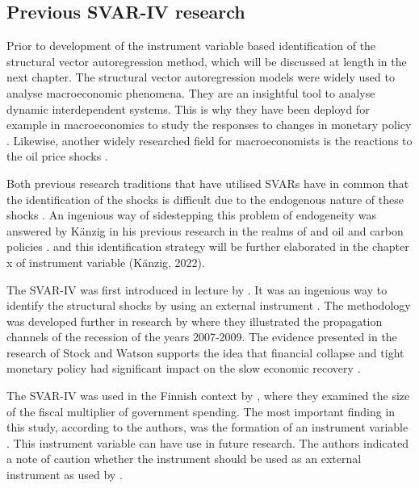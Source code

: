\documentclass[
]{article}
\begin{document}
\hypertarget{prevsvar}{%
\subsection{Previous SVAR-IV research}\label{prevsvar}}

Prior to development of the instrument variable based identification of the structural vector autoregression method, which will be discussed at length in the next chapter. The structural vector autoregression models were widely used to analyse macroeconomic phenomena. They are an insightful tool to analyse dynamic interdependent systems. This is why they have been deployd for example in macroeconomics to study the responses to changes in monetary policy \citep{wolf2020svar}. Likewise, another widely researched field for macroeconomists is the reactions to the oil price shocks \citep{kilian2009not}.

Both previous research traditions that have utilised SVARs have in common that the identification of the shocks is difficult due to the endogenous nature of these shocks \citep{kaenzig2021}. An ingenious way of sidestepping this problem of endogeneity was answered by Känzig in his previous research in the realms of and oil and carbon policies \citep{kaenzig2022,kaenzig2021}. and this identification strategy will be further elaborated in the chapter x of instrument variable (Känzig, 2022).

The SVAR-IV was first introduced in lecture by \citet{stock2008s}. It was an ingenious way to identify the structural shocks by using an external instrument \citep{stock2008s}. The methodology was developed further in research by \citet{stock2012disentangling} where they illustrated the propagation channels of the recession of the years 2007-2009. The evidence presented in the research of Stock and Watson supports the idea that financial collapse and tight monetary policy had significant impact on the slow economic recovery \citep{stock2012disentangling}.

The SVAR-IV was used in the Finnish context by \citet{keranen2020identification}, where they examined the size of the fiscal multiplier of government spending. The most important finding in this study, according to the authors, was the formation of an instrument variable \citep{keranen2020identification}. This instrument variable can have use in future research. The authors indicated a note of caution whether the instrument should be used as an external instrument as used by \citet{stock2008s,stock2012disentangling} \citep{keranen2020identification}.
\end{document}
